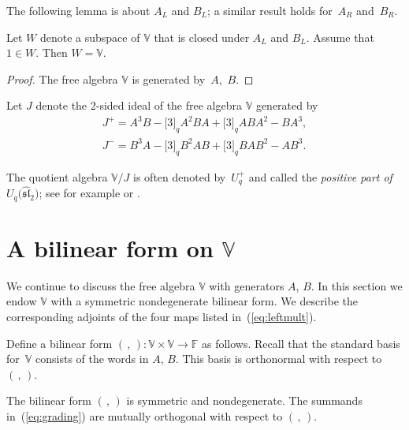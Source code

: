 The following lemma is about $A_L$ and $B_L$; a similar result holds for~$A_R$ and~$B_R$.

\begin{Lemma}\label{lem:WAB} Let $W$ denote a subspace of $\mathbb V$ that is closed
under $A_L$ and $B_L$. Assume that $1 \in W$. Then $W=\mathbb V$.
\end{Lemma}
\begin{proof} The free algebra $\mathbb V$ is generated by~$A$,~$B$.
\end{proof}

\begin{Definition}\label{def:idealJ}Let $J$ denote the 2-sided ideal of the free algebra $\mathbb V$ generated by
\begin{gather}
J^+=A^3 B - \lbrack 3 \rbrack_q A^2 B A+ \lbrack 3 \rbrack_q A B A^2 - B A^3,\label{eq:jplus}\\
J^-= B^3 A - \lbrack 3 \rbrack_q B^2 A B+ \lbrack 3 \rbrack_q B A B^2 - A B^3.\label{eq:jminus}
\end{gather}
\end{Definition}

\begin{Definition}\label{def:pp}The quotient algebra $\mathbb V/J$ is often denoted by~$U^+_q$ and called the {\it positive part of $U_q\big({\widehat{\mathfrak{sl}}}_2\big)$}; see for example
\cite[p.~40]{hongkang} or \cite[Corollary~3.2.6]{lusztig}.
\end{Definition}

\section[A bilinear form on $\mathbb V$]{A bilinear form on $\boldsymbol{\mathbb V}$}\label{section4}

We continue to discuss the free algebra $\mathbb V$ with generators $A$, $B$. In this section we endow $\mathbb V$ with a symmetric nondegenerate bilinear form. We describe the
corresponding adjoints of the four maps listed in~(\ref{eq:leftmult}).

\begin{Definition}\label{def:bilf}\rm Define a bilinear form $(\, ,\,)\colon \mathbb V\times \mathbb V \to
\mathbb F$ as follows. Recall that the standard basis for~$\mathbb V$
consists of the words in $A$, $B$. This basis is orthonormal with respect to $(\,,\,)$.
\end{Definition}

The bilinear form $(\,,\,)$ is symmetric and nondegenerate. The summands in~(\ref{eq:grading}) are mutually orthogonal with respect to $(\,,\,)$.

